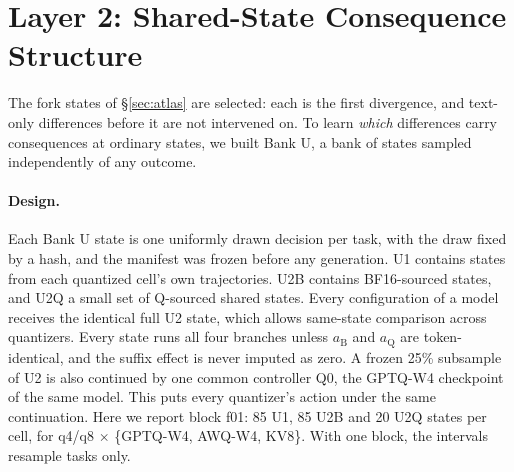 \section{Layer 2: Shared-State Consequence Structure}
\label{sec:banku}

The fork states of \S\ref{sec:atlas} are selected: each is the first divergence, and text-only differences before it are not intervened on. To learn \emph{which} differences carry consequences at ordinary states, we built Bank U, a bank of states sampled independently of any outcome.

\paragraph{Design.} Each Bank U state is one uniformly drawn decision per task, with the draw fixed by a hash, and the manifest was frozen before any generation. U1 contains states from each quantized cell's own trajectories. U2B contains BF16-sourced states, and U2Q a small set of Q-sourced shared states. Every configuration of a model receives the identical full U2 state, which allows same-state comparison across quantizers. Every state runs all four branches unless $a_{\mathrm{B}}$ and $a_{\mathrm{Q}}$ are token-identical, and the suffix effect is never imputed as zero. A frozen 25\% subsample of U2 is also continued by one common controller Q0, the GPTQ-W4 checkpoint of the same model. This puts every quantizer's action under the same continuation. Here we report block f01: 85 U1, 85 U2B and 20 U2Q states per cell, for q4/q8 $\times$ \{GPTQ-W4, AWQ-W4, KV8\}. With one block, the intervals resample tasks only. %

